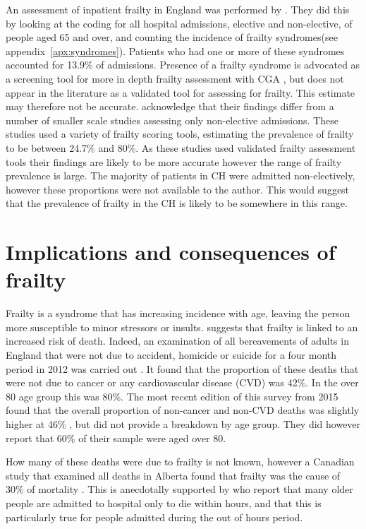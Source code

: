 \documentclass
[
	12pt,
	a4paper,
	oneside,
]{report}
\begin{document}
An assessment of inpatient frailty in England was performed by \textcite{soong:15}.
They did this by looking at the coding for all hospital admissions, elective
and non-elective, of people
aged 65 and over, and counting 
the incidence of frailty syndromes(see appendix~\ref{apx:syndromes}). 
Patients who had one or more of these syndromes accounted for 13.9\% of 
admissions. Presence of a frailty
syndrome is advocated as a screening tool for more in depth frailty assessment 
with CGA \parencite{silver:12}, but does not appear in the literature as a 
validated tool for assessing for frailty. This estimate may therefore not be 
accurate. \textcite{soong:15} acknowledge that their findings differ from 
a number of smaller scale studies assessing only non-elective admissions. These
studies used a variety of frailty scoring tools, estimating the prevalence of 
frailty to be between 24.7\% and 80\%. As these studies used validated frailty
assessment tools their findings are likely to be more accurate however the 
range of frailty prevalence is large. The majority of patients in CH were 
admitted non-electively, however these proportions were not available to the
author. This would suggest that the prevalence of frailty in the CH is likely
to be somewhere in this range.

\section{Implications and consequences of frailty}

\label{sec:frailty-implications}
Frailty is a syndrome that has increasing incidence with age, leaving the person
more susceptible to minor stressors or insults. \textcite{collard:12} suggests
that frailty is linked to an increased risk of death. Indeed,
an examination
of all bereavements of adults in England that were not due to accident, homicide or suicide for 
a four month period in 2012 was 
carried out \parencite{ons:13}. It found that the proportion of these deaths
that were not due to cancer or any cardiovascular disease (CVD) was 42\%. 
In the over 80
age group this was 80\%. The most recent edition of this survey from 2015 found
that the overall proportion of non-cancer and non-CVD deaths was slightly higher 
at 46\% \parencite{ons:16}, but did not provide a breakdown by age group. They 
did however report that 60\% of their sample were aged over 80.

How many of these deaths were due to frailty is not known, however 
a Canadian study that examined all deaths in Alberta found that frailty was the
cause of 30\% of mortality \parencite{fassbender:09}. This is anecdotally
supported by \textcite{silver:12} who report that many older people are admitted 
to hospital only to die within hours, and that
this is particularly true for people admitted during the out of hours period.
\end{document}
